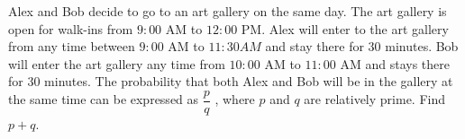 Alex and Bob decide to go to an art gallery on the same day. The art gallery is open for walk-ins from $9 : 00$ AM to $12 : 00$ PM. Alex will enter to the art gallery from any time between $9 : 00$ AM to $11 : 30 AM$ and stay there for $30$ minutes. Bob will enter the art gallery any time from $10 : 00$ AM to $11 : 00$ AM and stays there for $30$ minutes. The probability that both Alex and Bob will be in the gallery at the same time can be expressed as $\dfrac{p}{q}$ , where $p$ and $q$ are relatively prime. Find $p + q$.
